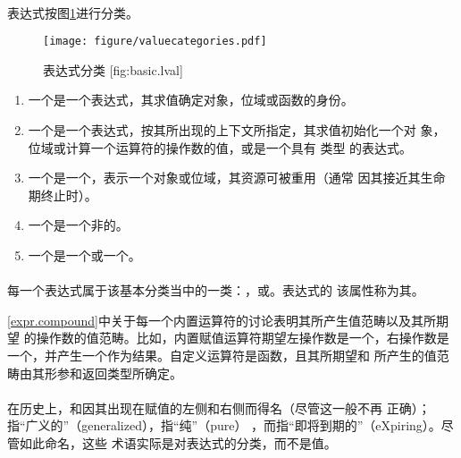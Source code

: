 \paragraph{} %
表达式按图\ref{fig:basic.lval}进行分类。

\begin{figure}[htpb]
  \centering
  \texttt{[image: figure/valuecategories.pdf]}
  \caption{表达式分类 [fig:basic.lval]}
  \label{fig:basic.lval}
\end{figure}

\begin{enumerate}
  \item 一个\glvalue{}是一个表达式，其求值确定对象，位域或函数的身份。
  \item 一个\prvalue{}是一个表达式，按其所出现的上下文所指定，其求值初始化一个对
        象，位域或计算一个运算符的操作数的值，或是一个具有 类型
        的表达式。
  \item 一个\xvalue{}是一个\glvalue{}，表示一个对象或位域，其资源可被重用（通常
        因其接近其生命期终止时）。
  \item 一个\lvalue{}是一个非\xvalue{}的\glvalue{}。
  \item 一个\rvalue{}是一个\prvalue{}或一个\xvalue{}。
\end{enumerate}

\paragraph{} %
每一个表达式属于该基本分类当中的一类：\lvalue{}，\xvalue{}或\prvalue{}。表达式的
该属性称为其。

\begin{note}
  \ref{expr.compound}中关于每一个内置运算符的讨论表明其所产生值范畴以及其所期望
  的操作数的值范畴。比如，内置赋值运算符期望左操作数是一个\lvalue{}，右操作数是
  一个\prvalue{}，并产生一个\lvalue{}作为结果。自定义运算符是函数，且其所期望和
  所产生的值范畴由其形参和返回类型所确定。
\end{note}

\paragraph{} %
\begin{note}
  在历史上，\lvalue{}和\rvalue{}因其出现在赋值的左侧和右侧而得名（尽管这一般不再
  正确）；\glvalue{}指“广义的”（generalized）\lvalue{}，\prvalue{}指“纯”（pure）
  \rvalue{}，而\xvalue{}指“即将到期的”（eXpiring）\lvalue{}。尽管如此命名，这些
  术语实际是对表达式的分类，而不是值。
\end{note}

